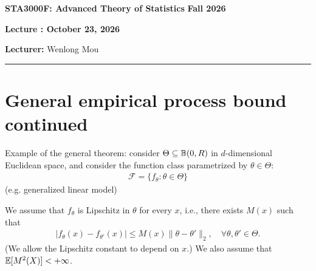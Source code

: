 \documentclass[11pt,letterpaper]{article}
\newcommand{\coursenumber}{STA3000F}
\newcommand{\coursetitle}{Advanced Theory of Statistics}
\newcommand{\courseterm}{Fall 2026}
\newcounter{lecture}
\newcommand{\lecturenumber}{\arabic{lecture}}
\newcommand{\lecturedate}{October 23, 2026}
\newcommand{\lecturer}{Wenlong Mou}
\numberwithin{theorem}{lecture}
\numberwithin{proposition}{lecture}
\numberwithin{lemma}{lecture}
\numberwithin{claim}{lecture}
\numberwithin{corollary}{lecture}
\numberwithin{definition}{lecture}
\numberwithin{conjecture}{lecture}
\numberwithin{remark}{lecture}
\numberwithin{example}{lecture}
\numberwithin{equation}{lecture}
\newcommand{\makelecturenotesheader}{%
  \noindent
  \textbf{\coursenumber: \coursetitle}%
  \hfill
  \textbf{\courseterm}

  \begin{center}
    {\Large\bfseries Lecture \lecturenumber: \lecturedate}
  \end{center}

  \noindent
  \textbf{Lecturer:} \lecturer
  \par\medskip
  \hrule
  \bigskip
}
\begin{document}
\makelecturenotesheader
\section{General empirical process bound continued}
Example of the general theorem: consider $\Theta \subseteq \mathbb{B} (0, R)$ in $d$-dimensional Euclidean space, and consider the function class parametrized by $\theta \in \Theta$:
\begin{align*}
  \mathcal{F} = \{f_\theta: \theta \in \Theta\}
\end{align*}
(e.g. generalized linear model)

We assume that $f_\theta$ is Lipschitz in $\theta$ for every $x$, i.e., there exists $M(x)$ such that
\begin{align*}
  |f_\theta (x) - f_{\theta'} (x)| \leq M(x) \|\theta - \theta'\|_2, \quad \forall \theta, \theta' \in \Theta.
\end{align*}
(We allow the Lipschitz constant to depend on $x$.) We also assume that ${\mathbb{E}} [M^2 (X)] < + \infty$.
\end{document}
